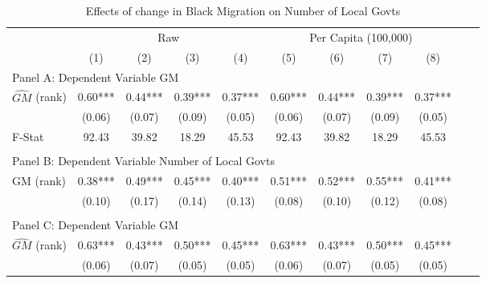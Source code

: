  \begin{table}[htbp]\centering {} \begin{threeparttable} \caption{Effects of change in Black Migration on Number of Local Govts} \begin{tabular}{l*{10}{c}} \toprule
                &\multicolumn{4}{c}{Raw}                                    &\multicolumn{4}{c}{Per Capita (100,000)}                   \\\cmidrule(lr){2-5}\cmidrule(lr){6-9}
                &\multicolumn{1}{c}{(1)}   &\multicolumn{1}{c}{(2)}   &\multicolumn{1}{c}{(3)}   &\multicolumn{1}{c}{(4)}   &\multicolumn{1}{c}{(5)}   &\multicolumn{1}{c}{(6)}   &\multicolumn{1}{c}{(7)}   &\multicolumn{1}{c}{(8)}   \\
\cmidrule(lr){1-9}
\multicolumn{8}{l}{Panel A: Dependent Variable GM}\\
\cmidrule(lr){1-9}
$\hat{GM}$ (rank)&       0.60***&       0.44***&       0.39***&       0.37***&       0.60***&       0.44***&       0.39***&       0.37***\\
                &     (0.06)   &     (0.07)   &     (0.09)   &     (0.05)   &     (0.06)   &     (0.07)   &     (0.09)   &     (0.05)   \\
\midrule
F-Stat          &      92.43   &      39.82   &      18.29   &      45.53   &      92.43   &      39.82   &      18.29   &      45.53   \\
\cmidrule[\heavyrulewidth](lr){1-9} \\ \cmidrule[\heavyrulewidth](lr){1-9}
\multicolumn{8}{l}{Panel B: Dependent Variable Number of Local Govts}\\
\cmidrule(lr){1-9}
GM  (rank)      &       0.38***&       0.49***&       0.45***&       0.40***&       0.51***&       0.52***&       0.55***&       0.41***\\
                &     (0.10)   &     (0.17)   &     (0.14)   &     (0.13)   &     (0.08)   &     (0.10)   &     (0.12)   &     (0.08)   \\
\cmidrule[\heavyrulewidth](lr){1-9} \\ \cmidrule[\heavyrulewidth](lr){1-9}
\multicolumn{8}{l}{Panel C: Dependent Variable GM}\\
\cmidrule(lr){1-9}
$\hat{GM}$ (rank)&       0.63***&       0.43***&       0.50***&       0.45***&       0.63***&       0.43***&       0.50***&       0.45***\\
                &     (0.06)   &     (0.07)   &     (0.05)   &     (0.05)   &     (0.06)   &     (0.07)   &     (0.05)   &     (0.05)   \\

\end{tabular}
\end{threeparttable}
\end{table}
